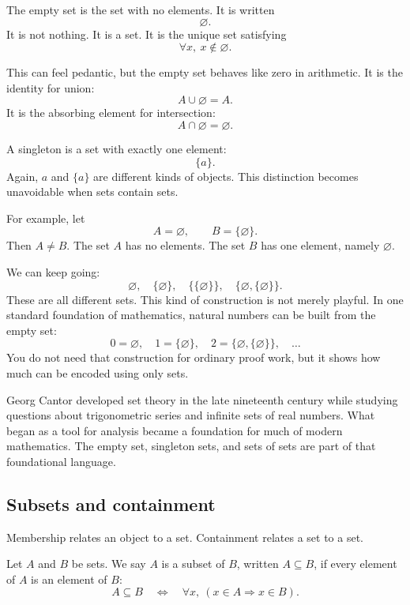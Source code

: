 The empty set is the set with no elements. It is written
\[
\varnothing.
\]
It is not nothing. It is a set. It is the unique set satisfying
\[
\forall x,\ x\notin\varnothing.
\]

This can feel pedantic, but the empty set behaves like zero in arithmetic. It is the identity for union:
\[
A\cup\varnothing=A.
\]
It is the absorbing element for intersection:
\[
A\cap\varnothing=\varnothing.
\]

A singleton is a set with exactly one element:
\[
\{a\}.
\]
Again, $a$ and $\{a\}$ are different kinds of objects. This distinction becomes unavoidable when sets contain sets.

For example, let
\[
A=\varnothing,\qquad B=\{\varnothing\}.
\]
Then $A\neq B$. The set $A$ has no elements. The set $B$ has one element, namely $\varnothing$.

We can keep going:
\[
\varnothing,\quad \{\varnothing\},\quad \{\{\varnothing\}\},\quad \{\varnothing,\{\varnothing\}\}.
\]
These are all different sets. This kind of construction is not merely playful. In one standard foundation of mathematics, natural numbers can be built from the empty set:
\[
0=\varnothing,\quad 1=\{\varnothing\},\quad 2=\{\varnothing,\{\varnothing\}\},\quad \ldots
\]
You do not need that construction for ordinary proof work, but it shows how much can be encoded using only sets.

\begin{historybox}
Georg Cantor developed set theory in the late nineteenth century while studying questions about trigonometric series and infinite sets of real numbers. What began as a tool for analysis became a foundation for much of modern mathematics. The empty set, singleton sets, and sets of sets are part of that foundational language.
\end{historybox}

\subsection{Subsets and containment}

Membership relates an object to a set. Containment relates a set to a set.

\begin{formalbox}
Let $A$ and $B$ be sets. We say $A$ is a subset of $B$, written $A\subseteq B$, if every element of $A$ is an element of $B$:
\[
A\subseteq B \quad\Longleftrightarrow\quad \forall x,\ (x\in A\Rightarrow x\in B).
\]
\end{formalbox}

